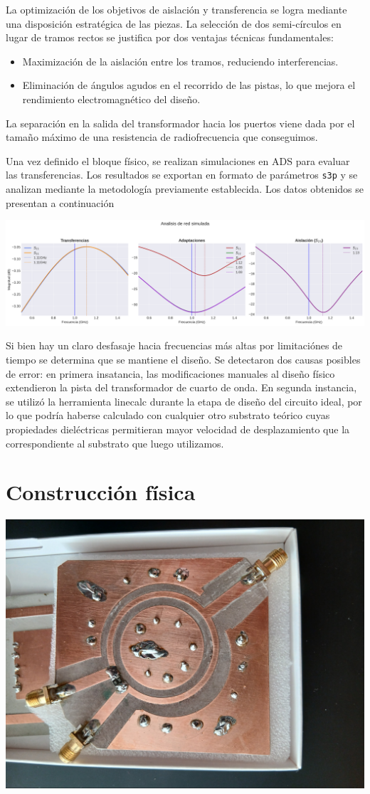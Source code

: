 \documentclass[a4paper, 12pt]{article}
\begin{document}
La optimización de los objetivos de aislación y transferencia se logra mediante una disposición estratégica de las piezas. La selección de dos semi-círculos en lugar de tramos rectos se justifica por dos ventajas técnicas fundamentales:
\begin{itemize}
    \item Maximización de la aislación entre los tramos, reduciendo interferencias.
    \item Eliminación de ángulos agudos en el recorrido de las pistas, lo que mejora el rendimiento electromagnético del diseño.
\end{itemize}
La separación en la salida del transformador hacia los puertos viene dada por el tamaño máximo de una resistencia de radiofrecuencia que conseguimos.

Una vez definido el bloque físico, se realizan simulaciones en ADS para evaluar las transferencias. Los resultados se exportan en formato de parámetros \texttt{s3p} y se analizan mediante la metodología previamente establecida. Los datos obtenidos se presentan a continuación

\includegraphics[width=0.9\linewidth]{./img/plot-simulado.png}

Si bien hay un claro desfasaje hacia frecuencias más altas por limitaciónes de tiempo se determina que se mantiene el diseño.
Se detectaron dos causas posibles de error: en primera insatancia, las modificaciones manuales al diseño físico extendieron la pista del transformador de cuarto de onda. En segunda instancia, se utilizó la herramienta linecalc durante la etapa de diseño del circuito ideal, por lo que podría haberse calculado con cualquier otro substrato teórico cuyas propiedades dieléctricas permitieran mayor velocidad de desplazamiento que la correspondiente al substrato que luego utilizamos.

\section*{Construcción física}

\begin{center}
\includegraphics[width=0.7\linewidth]{./img/real.jpg}
\end{center}
\end{document}
